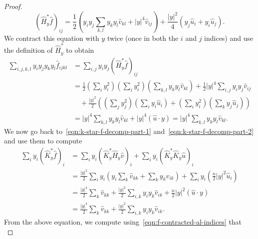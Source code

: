 \documentclass[11pt]{article}
\newcommand{\abs}[1]{\lvert #1 \rvert}
\begin{document}
\begin{proof}
\begin{equation}
\label{eqn:h-star-f}
(\widehat{H}^*_y\widehat f)_{ij}
=
\frac{1}{2}
\left(
y_iy_j\sum_{k,l}
y_ky_l\widehat v_{kl}
+
\abs{y}^4
\widehat v_{ij}
\right)
+
\frac{\abs{y}^2}{4}
\left(
y_j\widehat u_i+y_i\widehat u_j
\right).
\end{equation}
We contract this equation with $y$ twice (once in both the $i$ and $j$ indices) and use the definition of $\widehat{H}^*_y$ to obtain
\begin{equation}
\label{eqn:f-contracted-al-indices}
\begin{split}
\sum_{i,j,k,l}
y_iy_jy_ky_l
\widehat f_{ijkl}
&=
\sum_{i,j}
y_iy_j(\widehat{H}^*_y\widehat f)_{ij}
\\
&=
\frac12
\left(
\sum_i
y_i^2
\right)
\left(
\sum_i
y_i^2
\right)
\left(
\sum_{k,l}
y_ky_l\widehat v_{kl}
\right)
+
\frac12\abs{y}^4
\sum_{i,j}
y_iy_j\widehat v_{ij}
\\
&\quad
+
\frac{\abs{y}^2}{2}
\left(
\left(
\sum_j y_j^2
\right)
\left(
\sum_i
y_i\widehat u_i
\right)
+
\left(
\sum_i y_i^2
\right)
\left(
\sum_k
y_j\widehat u_j
\right)
\right)
\\
&=
\abs{y}^4
\sum_{k,l}y_ky_l\widehat v_{kl}
+
\abs{y}^4(\widehat u \cdot y)=
\abs{y}^4
\sum_{k,l}y_ky_l\widehat v_{kl}.
\end{split}
\end{equation}
We now go back to~\eqref{eqn:k-star-f-decomp-part-1} and~\eqref{eqn:k-star-f-decomp-part-2} and use them to compute
\begin{equation}
\begin{split}
\sum_{i}
y_i(\widehat{K}_y^*\widehat f)_i
&=
\sum_{i}
y_i(\widehat{K}_y^*\widehat{H}_y\widehat v)_i
+
\sum_{i}
y_i(\widehat{K}_y^*\widehat{K}_y\widehat u)_i
\\
&=
\frac{\abs{y}^2}{2}
\sum_{i}
y_i
\left(
y_i
\sum_{k}
\widehat v_{kk}
+
\sum_{k}
y_k\widehat v_{ik}
\right)
+
\sum_{i}
y_i
\left(
\frac{n}{2}
\abs{y}^2\widehat u_i
\right)
\\
&=
\frac{\abs{y}^4}{2}
\sum_{k}
\widehat v_{kk}
+
\frac{\abs{y}^2}{2}
\sum_{i,k}
y_iy_k
\widehat v_{ik}
+
\frac{n}{2}\abs{y}^2(\widehat u \cdot y)
\\
&=
\frac{\abs{y}^4}{2}
\sum_{k}
\widehat v_{kk}
+
\frac{\abs{y}^2}{2}
\sum_{i,k}
y_iy_k
\widehat v_{ik}.
\end{split}
\end{equation}
From the above equation, we compute using~\eqref{eqn:f-contracted-al-indices} that
\begin{equation}

\end{equation}
\end{proof}
\end{document}
